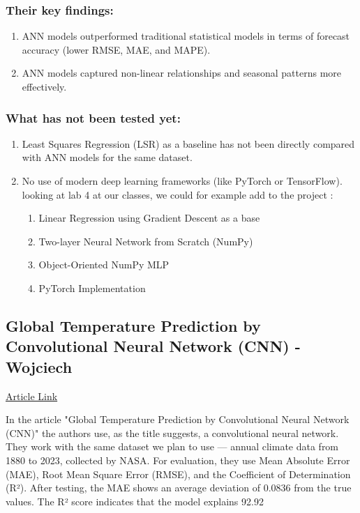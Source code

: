\documentclass{article}
\begin{document}
\subsubsection*{Their key findings:}
\begin{enumerate}
\item ANN models outperformed traditional statistical models in terms of forecast accuracy (lower RMSE, MAE, and MAPE).
\item ANN models captured non-linear relationships and seasonal patterns more effectively.
\end{enumerate}
\subsubsection*{What has not been tested yet:}
\begin{enumerate}
    
\item Least Squares Regression (LSR) as a baseline has not been directly compared with ANN models for the same dataset. 

\item No use of modern deep learning frameworks (like PyTorch or TensorFlow).
looking at lab 4 at our classes, we could for example add to the project :
\begin{enumerate}
\item Linear Regression using Gradient Descent as a base
\item Two-layer Neural Network from Scratch (NumPy)
\item Object-Oriented NumPy MLP
\item PyTorch Implementation

\end{enumerate}
\end{enumerate}

\subsection{Global Temperature Prediction by Convolutional Neural Network (CNN) - Wojciech}
\href{https://ejaset.com/index.php/journal/article/view/177/139}{Article Link}
\par{
In the article "Global Temperature Prediction by Convolutional Neural Network (CNN)" the authors use, as the title suggests, a convolutional neural network. They work with the same dataset we plan to use — annual climate data from 1880 to 2023, collected by NASA. For evaluation, they use Mean Absolute Error (MAE), Root Mean Square Error (RMSE), and the Coefficient of Determination (R²). After testing, the MAE shows an average deviation of 0.0836 from the true values. The R² score indicates that the model explains 92.92%
}
\end{document}
